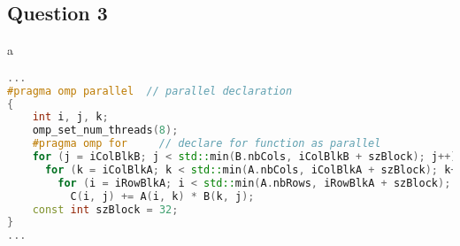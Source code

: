 \documentclass{article}
\begin{document}
\newpage\subsection*{Question 3}
\begin{resolution}
    a
    \begin{scriptsize}
        \mycode
        \begin{lstlisting}[language=C++]
...
#pragma omp parallel  // parallel declaration
{
    int i, j, k;
    omp_set_num_threads(8);
    #pragma omp for     // declare for function as parallel
    for (j = iColBlkB; j < std::min(B.nbCols, iColBlkB + szBlock); j++)
      for (k = iColBlkA; k < std::min(A.nbCols, iColBlkA + szBlock); k++)
        for (i = iRowBlkA; i < std::min(A.nbRows, iRowBlkA + szBlock); ++i)
          C(i, j) += A(i, k) * B(k, j);
    const int szBlock = 32;
}
...
        \end{lstlisting}
    \end{scriptsize}


\end{resolution}
\end{document}
